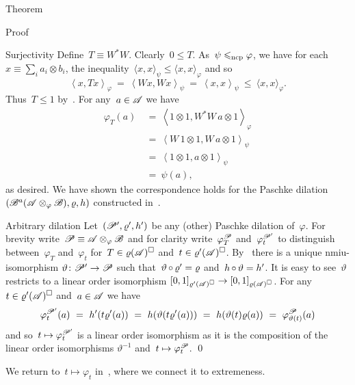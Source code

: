 \begin{parsec}
\begin{point}{Theorem}
\begin{point}{Proof}
\begin{point}{Surjectivity}
Define~$T \equiv W^*W$. Clearly~$0\leq T$.
As~$\psi \mathrel{\leqslant_{\mathrm{ncp}}} \varphi$,
    we have for each~$x \equiv \sum_i a_i \otimes b_i$,
    the inequality~$\langle x,x\rangle_\psi \leq \langle x,x\rangle_\varphi$
    and so
\begin{equation*}
    \left<x, Tx\right>_\varphi \ =\  \left<Wx,Wx\right>_\psi
    \ =\  \left<x,x\right>_\psi \ \leq\  \langle x,x \rangle_\varphi.
\end{equation*}
    Thus~$T \leq 1$ by~.
For any~$a\in \mathscr{A}$ we have
\begin{align*}
    \varphi_T(a) &\ =\  \left<1\otimes 1, W^*W\, a \otimes 1\right>_\varphi \\
    &  \ =\  \left<W\, 1\otimes 1, W\, a\otimes1\right>_\psi \\
    &  \ = \ \left<1\otimes1, a\otimes1\right>_\psi \\
    &  \ = \ \psi(a),
\end{align*}
    as desired.  We have shown the correspondence holds for
    the Paschke dilation~$(\mathscr{B}^a(\mathscr{A} \otimes_\varphi \mathscr{B}), \varrho, h)$
                constructed in~.
\end{point}
\begin{point}{Arbitrary dilation}%
Let~$(\mathscr{P}', \varrho', h')$ be any (other) Paschke dilation
    of~$\varphi$.
For brevity write~$\mathscr{P} \equiv \mathscr{A} \otimes_\varphi \mathscr{B}$
    and for clarity
    write~$\varphi_T^{\mathscr{P}}$
        and~$\varphi_t^{\mathscr{P}'}$
    to distinguish between~$\varphi_T$ and~$\varphi_t$
    for~$T \in \varrho(\mathscr{A})^\square$ and~$t \in \varrho'(\mathscr{A})^\square$.
By~
    there is a unique nmiu-isomorphism
    $\vartheta\colon \mathscr{P}' \to \mathscr{P}$
    such that~$\vartheta \mathop{\circ} \varrho' = \varrho $
    and~$h \mathop{\circ} \vartheta = h'$.
It is easy to see~$\vartheta$ restricts to a linear order isomorphism
    $[0,1]_{\varrho'(\mathscr{A})^\square} \to [0,1]_{\varrho(\mathscr{A})^\square}$.
For any~$t \in \varrho'(\mathscr{A})^\square$ and~$a\in \mathscr{A}$ we have
\begin{equation*}
    \varphi_t^{\mathscr{P}'} (a)
        \ = \ h'(t \varrho'(a))
        \ = \ h(\vartheta(t \varrho'(a)))
        \ = \ h(\vartheta(t) \varrho(a))
        \ = \ \varphi_{\vartheta(t)}^{\mathscr{P}}(a)
\end{equation*}
and so~$t \mapsto \varphi_t^{\mathscr{P}'}$
    is a linear order isomorphism as it
    is the composition of the linear order isomorphisms
    $\vartheta^{-1}$ and~$t \mapsto \varphi_t^{\mathscr{P}}$. \qed
\end{point}
\begin{point}%
We return to~$t \mapsto \varphi_t$
    in~,
    where we connect it to extremeness.
\end{point}
\end{point}
\end{point}
\end{parsec}

